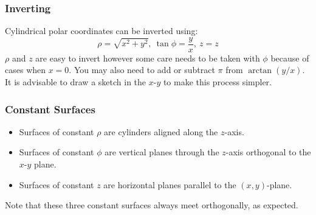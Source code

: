 \documentclass[../main.tex]{subfiles}
\begin{document}
\subsubsection{Inverting}
\label{invertingCylindrical}
Cylindrical polar coordinates can be inverted using:
\[
  \rho = \sqrt{x^2 + y^2},\ \tan \phi = \frac{y}{x},\ z = z
\]
$\rho$ and $z$ are easy to invert however some care needs to be taken with $\phi$ because of cases when $x = 0$.
You may also need to add or subtract $\pi$ from $\arctan(y/x)$.
It is advisable to draw a sketch in the $x$-$y$ to make this process simpler.
\subsubsection{Constant Surfaces}
\begin{itemize}
  \item Surfaces of constant $\rho$ are cylinders aligned along the $z$-axis.
  \item Surfaces of constant $\phi$ are vertical planes through the $z$-axis orthogonal to the $x$-$y$ plane.
  \item Surfaces of constant $z$ are horizontal planes parallel to the $(x, y)$-plane.
\end{itemize}
Note that these three constant surfaces always meet orthogonally, as expected.
\end{document}
